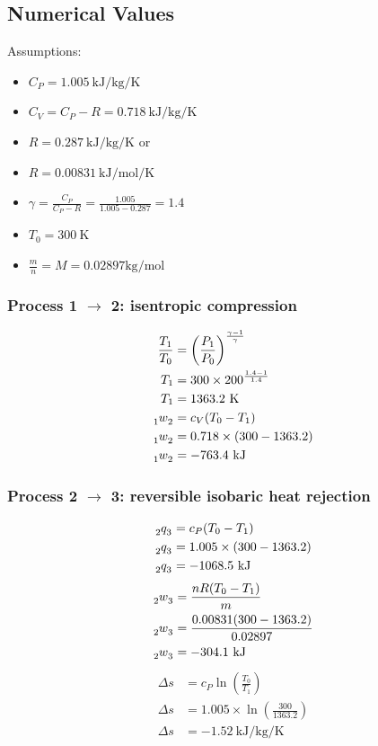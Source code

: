 \documentclass[12pt]{article}
\numberwithin{equation}{section}
\begin{document}
\begin{flushleft}
\subsection*{Numerical Values}
Assumptions:
\begin{multicols}{2}
  \begin{itemize}
    \item $C_P = 1.005 \ \si{\kilo\joule\per\kg\per\kelvin}$
    \item $C_V = C_P - R = 0.718 \ \si{\kilo\joule\per\kg\per\kelvin}$
    \item $R = 0.287 \ \si{\kilo\joule\per\kg\per\kelvin}$ or 
    \item $R = 0.00831 \ \si{\kilo\joule\per\mole\per\kelvin}$
    \item $\gamma =\frac{C_P}{C_P - R} = \frac{1.005}{1.005 - 0.287} = 1.4$
    \item $T_0 = 300 \ \si{\kelvin}$
    \item $\frac{m}{n} = M = 0.02897 \si{\kg\per\mole}$
  \end{itemize}
\end{multicols}
\subsubsection*{Process 1 $\rightarrow$ 2: isentropic compression}
\begin{align}
  \frac{T_1}{T_0} &= \left( \frac{P_1}{P_0} \right)^{\frac{\gamma - 1}{\gamma}}\\
  T_1 &= 300 \times 200^{\frac{1.4 - 1}{1.4}}\\
  T_1 &= 1363.2 \ \si{\kelvin}\\
  \tensor[_1]{w}{_2} &= c_V (T_0 - T_1)\\
  \tensor[_1]{w}{_2} &= 0.718\times (300 - 1363.2)\\
  \tensor[_1]{w}{_2} &= -763.4 \ \si{\kilo\joule}
\end{align}
\subsubsection*{Process 2 $\rightarrow$ 3: reversible isobaric heat rejection}
\begin{align}
  \tensor[_2]{q}{_3} &= c_P (T_0 - T_1)\\
  \tensor[_2]{q}{_3} &= 1.005 \times (300 - 1363.2)\\
  \tensor[_2]{q}{_3} &= -1068.5 \ \si{\kilo\joule}
\end{align}
\begin{align}
  \tensor[_2]{w}{_3} &= \frac{nR(T_0 - T_1)}{m}\\
  \tensor[_2]{w}{_3} &= \frac{0.00831(300 - 1363.2)}{0.02897}\\
  \tensor[_2]{w}{_3} &= -304.1 \ \si{\kilo\joule}
\end{align}
\begin{align}
  \Delta s &= c_P \ln \left( \frac{T_0}{T_1} \right)\\
  \Delta s &= 1.005 \times \ln \left( \frac{300}{1363.2} \right)\\
  \Delta s &= -1.52 \ \si{\kilo\joule\per\kg\per\kelvin}
\end{align}


\end{flushleft}
\end{document}

